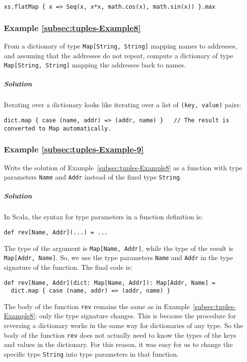 \begin{lstlisting}
xs.flatMap { x => Seq(x, x*x, math.cos(x), math.sin(x)) }.max
\end{lstlisting}


\subsubsection{Example \label{subsec:tuples-Example8}\ref{subsec:tuples-Example8}}

From a dictionary of type \lstinline!Map[String, String]! mapping
names to addresses, and assuming that the addresses do not repeat,
compute a dictionary of type \lstinline!Map[String, String]! mapping
the addresses back to names. 

\subparagraph{Solution}

Iterating over a dictionary looks like iterating over a list of \lstinline!(key, value)!
pairs:

\begin{lstlisting}
dict.map { case (name, addr) => (addr, name) }   // The result is converted to Map automatically.
\end{lstlisting}


\subsubsection{Example \label{subsec:tuples-Example-9}\ref{subsec:tuples-Example-9}}

Write the solution of Example~\ref{subsec:tuples-Example8} as a
function with type parameters \lstinline!Name! and \lstinline!Addr!
instead of the fixed type \lstinline!String!.

\subparagraph{Solution}

In Scala, the syntax for type parameters in a function definition
is:
\begin{lstlisting}
def rev[Name, Addr](...) = ...
\end{lstlisting}
The type of the argument is \lstinline!Map[Name, Addr]!, while the
type of the result is \lstinline!Map[Addr, Name]!. So, we use the
type parameters \lstinline!Name! and \lstinline!Addr! in the type
signature of the function. The final code is:
\begin{lstlisting}
def rev[Name, Addr](dict: Map[Name, Addr]): Map[Addr, Name] =
  dict.map { case (name, addr) => (addr, name) }
\end{lstlisting}
The body of the function \lstinline!rev! remains the same as in Example~\ref{subsec:tuples-Example8};
only the type signature changes. This is because the procedure for
reversing a dictionary works in the same way for dictionaries of any
type. So the body of the function \lstinline!rev! does not actually
need to know the types of the keys and values in the dictionary. For
this reason, it was easy for us to change the specific type \lstinline!String!
into type parameters in that function.

